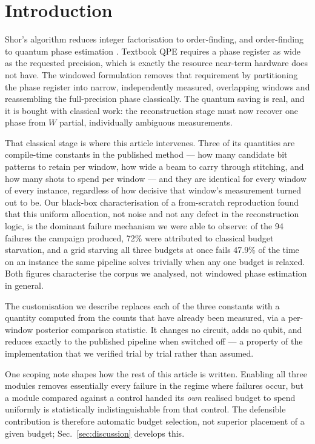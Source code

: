 \documentclass[preprint,11pt]{elsarticle}
\begin{document}
\section*{Introduction}
\label{sec:intro}

Shor's algorithm \cite{shor1997} reduces integer factorisation to
order-finding, and order-finding to quantum phase estimation
\cite{kitaev1995,cleve1998,nielsenchuang}. Textbook QPE requires a phase
register as wide as the requested precision, which is exactly the
resource near-term hardware does not have. The windowed formulation
\cite{wqpe2025,modularshor2025} removes that requirement by partitioning
the phase register into narrow, independently measured, overlapping
windows and reassembling the full-precision phase classically. The
quantum saving is real, and it is bought with classical work: the
reconstruction stage must now recover one phase from $W$ partial,
individually ambiguous measurements.

That classical stage is where this article intervenes. Three of its
quantities are compile-time constants in the published method --- how
many candidate bit patterns to retain per window, how wide a beam to
carry through stitching, and how many shots to spend per window --- and
they are identical for every window of every instance, regardless of how
decisive that window's measurement turned out to be. Our black-box
characterisation of a from-scratch reproduction found that this uniform
allocation, not noise and not any defect in the reconstruction logic, is
the dominant failure mechanism we were able to observe: of the 94
failures the campaign produced, 72\% were attributed to classical budget
starvation, and a grid starving all three budgets at once fails 47.9\% of
the time on an instance the same pipeline solves trivially when any one
budget is relaxed. Both figures characterise the corpus we analysed, not
windowed phase estimation in general.

The customisation we describe replaces each of the three constants with a
quantity computed from the counts that have already been measured, via a
per-window posterior comparison statistic. It changes no circuit, adds no
qubit, and reduces exactly to the published pipeline when switched off ---
a property of the implementation that we verified trial by trial rather
than assumed.

One scoping note shapes how the rest of this article is written.
Enabling all three modules removes essentially every failure in the
regime where failures occur, but a module compared against a control
handed its \emph{own} realised budget to spend uniformly is
statistically indistinguishable from that control. The defensible
contribution is therefore automatic budget selection, not superior
placement of a given budget; Sec.~\ref{sec:discussion} develops this.
\end{document}
